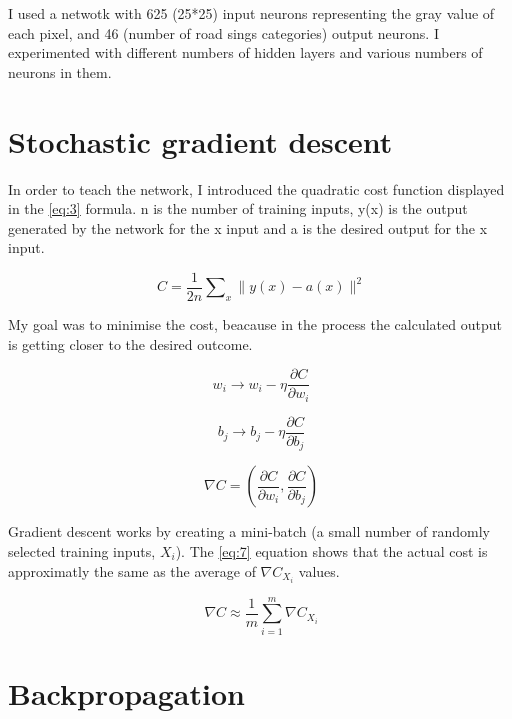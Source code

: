 I used a netwotk with 625 (25*25) input neurons representing the gray value of each pixel, and 46 (number of road sings categories) output neurons. I experimented with different numbers of hidden layers and various numbers of neurons in them.


\section{Stochastic gradient descent}\label{sec:INTRO:graddesc}

In order to teach the network, I introduced the quadratic cost function displayed in the \ref{eq:3} formula. n is the number of training inputs, y(x) is the output generated by the network for the x input and a is the desired output for the x input.

\begin{equation} \label{eq:3}
\ C = \frac{1}{2n}\sum\nolimits_{x} \|y(x)-a(x)\|^2
\end{equation}

My goal was to minimise the cost, beacause in the process the calculated output is getting closer to the desired outcome. 

\begin{equation} \label{eq:4}
\ w_{i} \rightarrow w_{i} - \eta\frac{\partial C}{\partial w_{i}} 
\end{equation}

\begin{equation} \label{eq:5}
\ b_{j} \rightarrow b_{j} - \eta\frac{\partial C}{\partial b_{j}} 
\end{equation}

\begin{equation} \label{eq:6}
\ \nabla C = (\frac{\partial C}{\partial w_{i}},\frac{\partial C}{\partial b_{j}})
\end{equation}

Gradient descent works by creating a mini-batch (a small number of randomly selected training inputs, $X_{i}$). The \ref{eq:7} equation shows that the actual cost is approximatly the same as the average of $\nabla C_{X_{i}}$ values.

\begin{equation} \label{eq:7}
\ \nabla C \approx \frac{1}{m} \sum\limits_{i=1}^m \nabla C_{X_{i}}
\end{equation}

\section{Backpropagation}\label{sec:INTRO:backprop}
